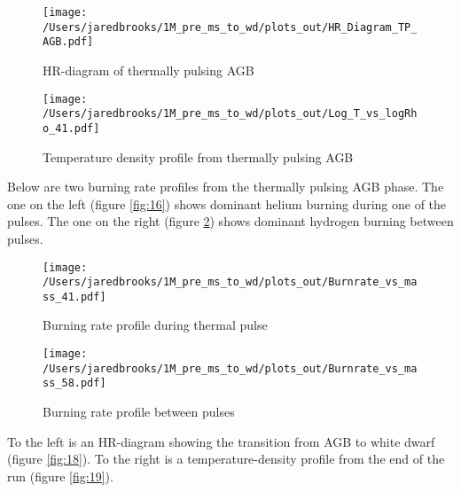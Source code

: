 \documentclass{article}
\begin{document}
        \begin{figure}[H]
          \begin{minipage}[b]{0.5\linewidth}
            \centering
            \texttt{[image: /Users/jaredbrooks/1M\_pre\_ms\_to\_wd/plots\_out/HR\_Diagram\_TP\_AGB.pdf]}
            \caption{HR-diagram of thermally pulsing AGB}
            \label{fig:14}
          \end{minipage}
          \hspace{0cm}
          \begin{minipage}[b]{0.5\linewidth}
            \centering
            \texttt{[image: /Users/jaredbrooks/1M\_pre\_ms\_to\_wd/plots\_out/Log\_T\_vs\_logRho\_41.pdf]}
            \caption{Temperature density profile from thermally pulsing AGB}
            \label{fig:15}
          \end{minipage}
        \end{figure}

        Below are two burning rate profiles from the thermally pulsing AGB phase.  The one on the left (figure \ref{fig:16}) shows dominant helium burning during one of the pulses.  The one on the right (figure \ref{fig:17}) shows dominant hydrogen burning between pulses.

        \begin{figure}[H]
          \begin{minipage}[b]{0.5\linewidth}
            \centering
            \texttt{[image: /Users/jaredbrooks/1M\_pre\_ms\_to\_wd/plots\_out/Burnrate\_vs\_mass\_41.pdf]}
            \caption{Burning rate profile during thermal pulse}
            \label{fig:16}
          \end{minipage}
          \hspace{0cm}
          \begin{minipage}[b]{0.5\linewidth}
            \centering
            \texttt{[image: /Users/jaredbrooks/1M\_pre\_ms\_to\_wd/plots\_out/Burnrate\_vs\_mass\_58.pdf]}
            \caption{Burning rate profile between pulses}
            \label{fig:17}
          \end{minipage}
        \end{figure}

        \pagebreak

        To the left is an HR-diagram showing the transition from AGB to white dwarf (figure \ref{fig:18}).  To the right is a temperature-density profile from the end of the run (figure \ref{fig:19}).
\end{document}
